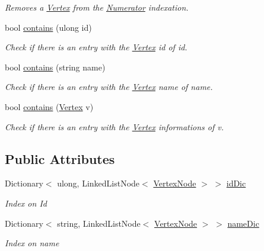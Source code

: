 \begin{DoxyCompactItemize}
\begin{DoxyCompactList}\small\item\em Removes a \hyperlink{structVertex}{Vertex} from the \hyperlink{classNumerator}{Numerator} indexation. \end{DoxyCompactList}\item 
bool \hyperlink{classNumerator_a93c695826053065b04103031eed157ce}{contains} (ulong id)
\begin{DoxyCompactList}\small\item\em Check if there is an entry with the \hyperlink{structVertex}{Vertex} id of id. \end{DoxyCompactList}\item 
bool \hyperlink{classNumerator_ae3c1fcc2141cb29c89b0da1ffe2af9ea}{contains} (string name)
\begin{DoxyCompactList}\small\item\em Check if there is an entry with the \hyperlink{structVertex}{Vertex} name of name. \end{DoxyCompactList}\item 
bool \hyperlink{classNumerator_acd284ff3d7b2b03a1ef77af440e8221b}{contains} (\hyperlink{structVertex}{Vertex} v)
\begin{DoxyCompactList}\small\item\em Check if there is an entry with the \hyperlink{structVertex}{Vertex} informations of v. \end{DoxyCompactList}\end{DoxyCompactItemize}
\subsection*{Public Attributes}
\begin{DoxyCompactItemize}
\item 
Dictionary$<$ ulong, Linked\+List\+Node$<$ \hyperlink{classVertexNode}{Vertex\+Node} $>$ $>$ \hyperlink{classNumerator_a3f24879acaa114066b86c6093bfe57d6}{id\+Dic}
\begin{DoxyCompactList}\small\item\em Index on Id\end{DoxyCompactList}\item 
Dictionary$<$ string, Linked\+List\+Node$<$ \hyperlink{classVertexNode}{Vertex\+Node} $>$ $>$ \hyperlink{classNumerator_a84d702ba15a33e939ce9b2869becc19e}{name\+Dic}
\begin{DoxyCompactList}\small\item\em Index on name\end{DoxyCompactList}\end{DoxyCompactItemize}


